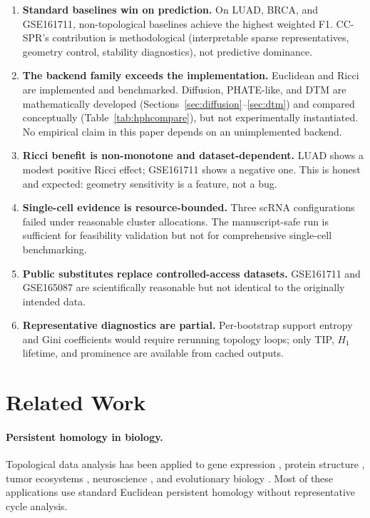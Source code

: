 \documentclass[11pt]{article}
\begin{document}
\begin{enumerate}[leftmargin=1.5em]
\item \textbf{Standard baselines win on prediction.}
On LUAD, BRCA, and GSE161711, non-topological baselines achieve the highest weighted F1.
CC-SPR's contribution is methodological (interpretable sparse representatives, geometry control, stability diagnostics), not predictive dominance.

\item \textbf{The backend family exceeds the implementation.}
Euclidean and Ricci are implemented and benchmarked.
Diffusion, PHATE-like, and DTM are mathematically developed (Sections~\ref{sec:diffusion}--\ref{sec:dtm}) and compared conceptually (Table~\ref{tab:hphcompare}), but not experimentally instantiated.
No empirical claim in this paper depends on an unimplemented backend.

\item \textbf{Ricci benefit is non-monotone and dataset-dependent.}
LUAD shows a modest positive Ricci effect; GSE161711 shows a negative one.
This is honest and expected: geometry sensitivity is a feature, not a bug.

\item \textbf{Single-cell evidence is resource-bounded.}
Three scRNA configurations failed under reasonable cluster allocations.
The manuscript-safe run is sufficient for feasibility validation but not for comprehensive single-cell benchmarking.

\item \textbf{Public substitutes replace controlled-access datasets.}
GSE161711 and GSE165087 are scientifically reasonable but not identical to the originally intended data.

\item \textbf{Representative diagnostics are partial.}
Per-bootstrap support entropy and Gini coefficients would require rerunning topology loops; only TIP, $H_1$ lifetime, and prominence are available from cached outputs.
\end{enumerate}

\section{Related Work}

\paragraph{Persistent homology in biology.}
Topological data analysis has been applied to gene expression \cite{rizvi2017}, protein structure \cite{xia2014}, tumor ecosystems \cite{vipond2021}, neuroscience \cite{giusti2015}, and evolutionary biology \cite{chan2013topology}.
Most of these applications use standard Euclidean persistent homology without representative cycle analysis.
\end{document}
